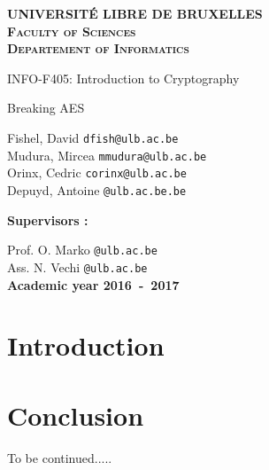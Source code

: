 \documentclass[a4paper,10pt]{report}
\begin{document}
\begin{titlepage}
\begin{center}
\textbf{\textsc{UNIVERSIT\'E LIBRE DE BRUXELLES}}\\
\textbf{\textsc{Faculty of Sciences}}\\
\textbf{\textsc{Departement of Informatics}}
\vfill{}\vfill{}
\begin{center}{\Huge INFO-F405: Introduction to Cryptography}\end{center}{\Huge \par}
\begin{center}{\Huge Breaking AES}\end{center}{\Huge \par}
\begin{center}{\large Fishel, David
			\texttt{dfish@ulb.ac.be}\\
			Mudura, Mircea
			\texttt{mmudura@ulb.ac.be}\\
			Orinx, Cedric
			\texttt{corinx@ulb.ac.be}\\
			Depuyd, Antoine
			\texttt{@ulb.ac.be.be} 
		}\end{center}{\Huge \par}
\vfill{}\vfill{}
\begin{flushleft}{\large \textbf{Supervisors :}}\hfill{}\end{flushleft}{\large\par}Prof. O. Marko \texttt{@ulb.ac.be}\\ Ass. N. Vechi \texttt{@ulb.ac.be}\\
\vfill{}\vfill{}\enlargethispage{3cm}
\textbf{Academic year 2016~-~2017}
\end{center}
\end{titlepage}


\tableofcontents


\chapter{Introduction}


\chapter{Conclusion}
To be continued.....



\end{document}

